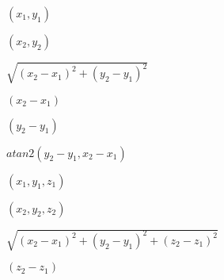 \documentclass{article}
\begin{document}
$(x_1,y_1)$
\pagebreak

$(x_2,y_2)$
\pagebreak

$\sqrt{(x_2-x_1)^2+(y_2-y_1)^2}$
\pagebreak

$(x_2-x_1)$
\pagebreak

$(y_2-y_1)$
\pagebreak

$atan2(y_2 - y_1,x_2 - x_1)$
\pagebreak

$(x_1,y_1,z_1)$
\pagebreak

$(x_2,y_2,z_2)$
\pagebreak

$\sqrt{(x_2-x_1)^2+(y_2-y_1)^2+(z_2-z_1)^2}$
\pagebreak

$(z_2-z_1)$
\pagebreak
\end{document}
